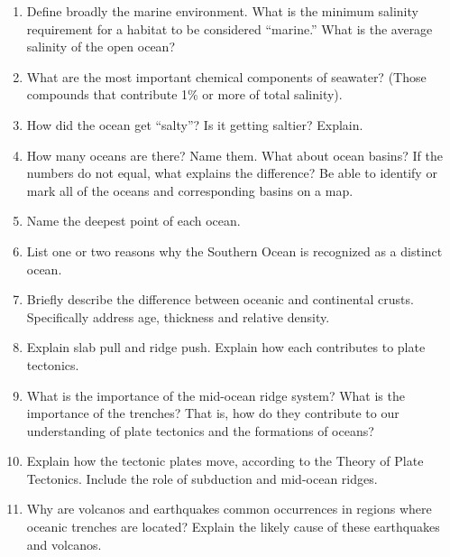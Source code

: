 \documentclass[nofonts, letterpaper]{tufte-handout}
\begin{document}
\begin{enumerate}
\item Define broadly the marine environment. What is the minimum salinity requirement for a habitat to be considered ``marine.''  What is the average salinity of the open ocean?

\item What are the most important chemical components of seawater? (Those compounds that contribute 1\% or more of total salinity).

\item How did the ocean get ``salty''? Is it getting saltier?  Explain.

\item How many oceans are there?  Name them. What about ocean basins?  If the numbers do not equal, what explains the difference? Be able to identify or mark all of the oceans and corresponding basins on a map.

\item Name the deepest point of each ocean.

\item List one or two reasons why the Southern Ocean is recognized as a distinct ocean.


\item Briefly describe the difference between oceanic and continental crusts.  Specifically address age, thickness and relative density.

\item Explain slab pull and ridge push. Explain how each contributes to plate tectonics.

\item What is the importance of the mid-ocean ridge system?  What is the importance of the trenches?  That is, how do they contribute to our understanding of plate tectonics and the formations of oceans?

\item Explain how the tectonic plates move, according to the Theory of Plate Tectonics.  Include the role of subduction and mid-ocean ridges.

\item Why are volcanos and earthquakes common occurrences in regions where oceanic trenches are located?  Explain the likely cause of these earthquakes and volcanos.


\end{enumerate}
\end{document}
